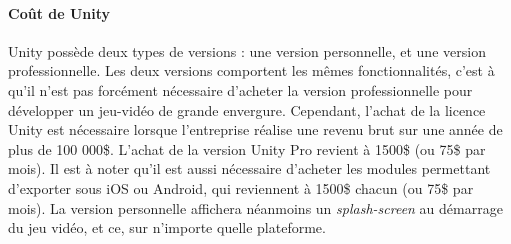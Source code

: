 \paragraph{Coût de Unity}
Unity possède deux types de versions : une version personnelle, et une version professionnelle. Les deux versions comportent les mêmes fonctionnalités, c'est à qu'il n'est pas forcément nécessaire d'acheter la version professionnelle pour développer un jeu-vidéo de grande envergure. Cependant, l'achat de la licence Unity est nécessaire lorsque l'entreprise réalise une revenu brut sur une année de plus de 100 000\$. L'achat de la version Unity Pro revient à 1500\$ (ou 75\$ par mois). Il est à noter qu'il est aussi nécessaire d'acheter les modules permettant d'exporter sous iOS ou Android, qui reviennent à 1500\$ chacun (ou 75\$ par mois). La version personnelle affichera néanmoins un \textit{splash-screen} au démarrage du jeu vidéo, et ce, sur n'importe quelle plateforme.


